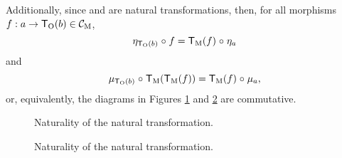 \begin{definition}
  Additionally, since \nat{\eta} and \nat{\mu} are natural
  transformations, then, for all morphisms $f: a \to \mathsf{T}_{\operatorname{O}}(b) \in
  \mathcal{C}_{\operatorname{M}}$,
  \begin{equation}
    \label{eq:monad-naturality-unit}
    \eta_{\mathsf{T}_{\operatorname{O}}(b)} \mathrel{\circ} f = \mathsf{T}_{\operatorname{M}}(f) \mathrel{\circ} \eta_{a}
  \end{equation}
  and
  \begin{equation}
    \label{eq:monad-naturality-multiplication}
    \mu_{\mathsf{T}_{\operatorname{O}}(b)} \mathrel{\circ} \mathsf{T}_{\operatorname{M}}(\mathsf{T}_{\operatorname{M}}(f)) = \mathsf{T}_{\operatorname{M}}(f) \mathrel{\circ} \mu_{a}
    \text{,}
  \end{equation}
  or, equivalently, the diagrams in Figures
  \ref{fig:monad-naturality-unit} and
  \ref{fig:monad-naturality-multiplication} are commutative.
  \begin{figure}[htbp]
    \begin{center}
    \end{center}
    \caption{Naturality of the \nat{\eta} natural transformation.}
    \label{fig:monad-naturality-unit}
  \end{figure}
  \begin{figure}[htbp]
    \begin{center}
    \end{center}
    \caption{Naturality of the \nat{\mu} natural transformation.}
    \label{fig:monad-naturality-multiplication}
  \end{figure}
\end{definition}

